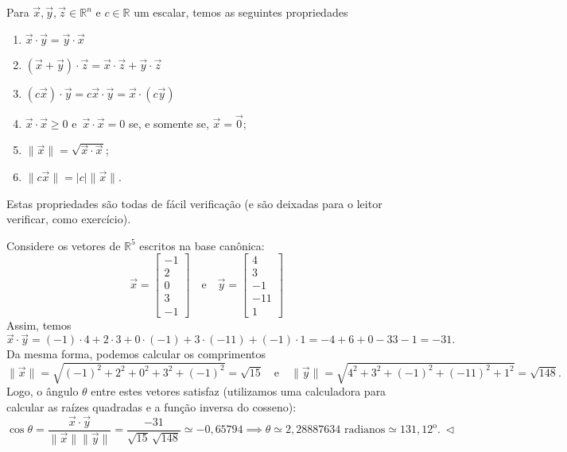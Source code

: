 \documentclass[../livro.tex]{subfiles}  %
\begin{document}
\begin{proposition}
	Para $\vec{x}, \vec{y}, \vec{z} \in \mathbb{R}^n$ e $c \in \mathbb{R}$ um escalar, temos as seguintes propriedades
	\begin{enumerate}
		\item  $\vec{x} \cdot \vec{y} = \vec{y} \cdot \vec{x}$
		\item  $(\vec{x} + \vec{y}) \cdot \vec{z} = \vec{x} \cdot \vec{z} + \vec{y} \cdot \vec{z}$
		\item  $(c\vec{x}) \cdot \vec{y} = c \vec{x} \cdot \vec{y} = \vec{x} \cdot (c\vec{y})$
		\item  $\vec{x} \cdot \vec{x} \ge 0$ e $\, \vec{x} \cdot \vec{x} = 0$ se, e somente se, $\vec{x} = \vec{0}$;
		\item  $\|\vec{x}\| = \sqrt{\vec{x} \cdot \vec{x}}$;
		\item  $\| c \vec{x} \| =  |c| \| \vec{x} \|$.
	\end{enumerate}
\end{proposition}

Estas propriedades são todas de fácil verificação (e são deixadas para o leitor verificar, como exercício).

\begin{example}
	Considere os vetores de $\mathbb{R}^5$ escritos na base canônica:
	\begin{equation}
	\vec{x} =
	\begin{bmatrix}
	-1 \\ 2 \\ 0 \\ 3 \\ -1
	\end{bmatrix} \quad \text{e} \quad \vec{y} =
	\begin{bmatrix}
	4 \\ 3 \\ -1 \\ -11 \\ 1
	\end{bmatrix}
	\end{equation} Assim, temos
	\begin{equation}
	\vec{x} \cdot \vec{y} = (-1)\cdot 4 + 2 \cdot 3 + 0 \cdot (-1) +3 \cdot(-11) + (-1)\cdot 1 = -4 + 6 +0 -33 -1 = -31.
	\end{equation} Da mesma forma, podemos calcular os comprimentos
	\begin{equation}
	\| \vec{x} \| = \sqrt{(-1)^2 + 2^2 + 0^2 + 3^2 + (-1)^2} = \sqrt{15} \quad \text{e} \quad \| \vec{y} \| = \sqrt{4^2 + 3^2 + (-1)^2 + (-11)^2 + 1^2} = \sqrt{148}.
	\end{equation} Logo, o ângulo $\theta$ entre estes vetores satisfaz (utilizamos uma calculadora para calcular as raízes quadradas e a função inversa do cosseno):
	\begin{equation}
	\cos \theta = \frac{\vec{x} \cdot \vec{y}}{\|\vec{x}\| \|\vec{y}\|} = \frac{-31}{\sqrt{15} \, \sqrt{148}} \simeq -0,65794 \implies  \theta \simeq 2,28887634 \textrm{ radianos} \simeq 131,12^{\text{o}}. \ \lhd
	\end{equation}
\end{example}
\end{document}
